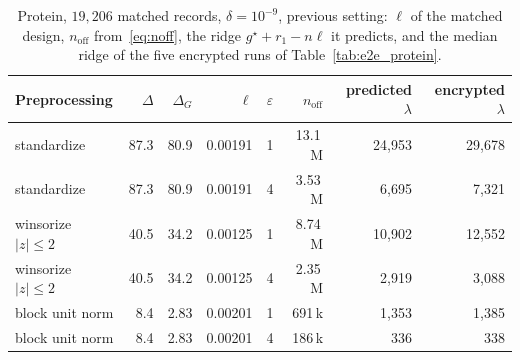\documentclass[11pt]{article}
\theoremstyle{definition}
\theoremstyle{plain}
\begin{document}
\begin{table}[ht]
  \centering\small
  \caption{Protein, $19{,}206$ matched records, $\delta = 10^{-9}$, previous setting: $\ell$ of the matched design, $n_{\mathrm{off}}$ from~\eqref{eq:noff}, the ridge $g^\star + r_1 - n\ell$ it predicts, and the median ridge of the five encrypted runs of Table~\ref{tab:e2e_protein}.}
  \label{tab:noff_protein}
  \begin{tabular}{@{}lrrrcrrr@{}}
    \toprule
    Preprocessing & $\Delta$ & $\Delta_G$ & $\ell$ & $\varepsilon$ & $n_{\mathrm{off}}$ & predicted $\lambda$ & encrypted $\lambda$ \\
    \midrule
    standardize & 87.3 & 80.9 & 0.00191 & 1 & 13.1\,M & 24{,}953 & 29{,}678 \\
    standardize & 87.3 & 80.9 & 0.00191 & 4 & 3.53\,M & 6{,}695 & 7{,}321 \\
    winsorize $|z| \le 2$ & 40.5 & 34.2 & 0.00125 & 1 & 8.74\,M & 10{,}902 & 12{,}552 \\
    winsorize $|z| \le 2$ & 40.5 & 34.2 & 0.00125 & 4 & 2.35\,M & 2{,}919 & 3{,}088 \\
    block unit norm & 8.4 & 2.83 & 0.00201 & 1 & 691\,k & 1{,}353 & 1{,}385 \\
    block unit norm & 8.4 & 2.83 & 0.00201 & 4 & 186\,k & 336 & 338 \\
    \bottomrule
  \end{tabular}
\end{table}
\end{document}
